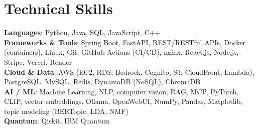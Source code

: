 \documentclass[letterpaper,10pt]{article}
\newcommand{\nk}{\kern0pt}
\begin{document}
\section{Technical Skills}
 \begin{itemize}[leftmargin=0.15in, label={}]
    \small{\item{
     \textbf{Languages}{: Python, Java, SQL, JavaScript, C++} \\
     \textbf{F\nk rameworks \& T\nk ools}{: Spring Boot, FastAPI, REST/RESTful APIs, Docker (containers), Linux, Git, GitHub Actions (CI/CD), nginx, React.js, Node.js, Stripe, Vercel, Render} \\
     \textbf{Cloud \& Data}{: A\nk WS (EC2, RDS, Bedrock, Cognito, S3, CloudFront, Lambda), PostgreSQL, MySQL, Redis, DynamoDB (NoSQL), ChromaDB} \\
     \textbf{AI / ML}{: Machine Learning, NLP, computer vision, RAG, MCP, PyTorch, CLIP, vector embeddings, Ollama, OpenWebUI, NumPy, Pandas, Matplotlib, topic modeling (BERTopic, LDA, NMF)} \\
     \textbf{Quantum}{: Qiskit, IBM Quantum} \\
    }}
 \end{itemize}

\end{document}

